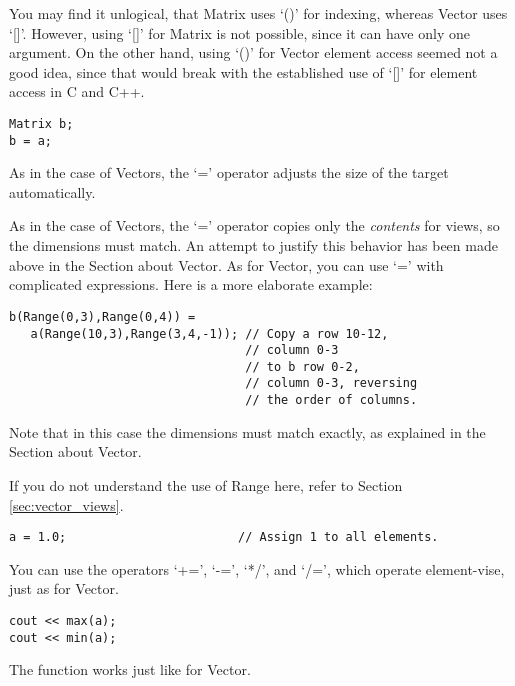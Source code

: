 You may find it unlogical, that Matrix uses `()' for indexing, whereas
Vector uses `[]'. However, using `[]' for Matrix is not possible,
since it can have only one argument. On the other hand, using `()' for
Vector element access seemed not a good idea, since that would break
with the established use of `[]' for element access in C and C++.

\begin{verbatim}
Matrix b;
b = a;
\end{verbatim}

As in the case of Vectors, the `=' operator adjusts the size of the
target automatically.


As in the case of Vectors, the `=' operator copies only the
\emph{contents} for views, so the dimensions must match. An attempt to justify
this behavior has been made above in the Section about Vector. As for
Vector, you can use `=' with complicated expressions. Here is a more
elaborate example:

\begin{verbatim}
b(Range(0,3),Range(0,4)) =
   a(Range(10,3),Range(3,4,-1)); // Copy a row 10-12,
                                 // column 0-3 
                                 // to b row 0-2,
                                 // column 0-3, reversing
                                 // the order of columns.
\end{verbatim}
Note that in this case the dimensions must match exactly, as explained
in the Section about Vector.

If you do not understand the use of Range here, refer to Section
\ref{sec:vector_views}. 

\begin{verbatim}
a = 1.0;                        // Assign 1 to all elements.
\end{verbatim}


You can use the operators `+=', `-=', `*/', and `/=', which operate
element-vise, just as for Vector.

\begin{verbatim}
cout << max(a);
cout << min(a);
\end{verbatim}


The function  works just like for Vector.

